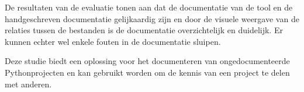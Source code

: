 De resultaten van de evaluatie tonen aan dat de documentatie van de tool en de handgeschreven documentatie gelijkaardig zijn en door de visuele weergave van de relaties tussen de bestanden is de documentatie overzichtelijk en duidelijk.
Er kunnen echter wel enkele fouten in de documentatie sluipen.

Deze studie biedt een oplossing voor het documenteren van ongedocumenteerde Pythonprojecten en kan gebruikt worden om de kennis van een project te delen met anderen.
